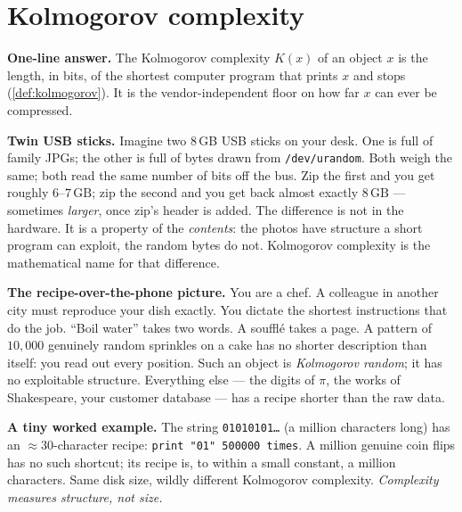 
%

\section{Kolmogorov complexity}
\label{sec:kolmogorov}

\begin{intuition}
\textbf{One-line answer.}  The Kolmogorov complexity $K(x)$ of an
object $x$ is the length, in bits, of the shortest computer program
that prints $x$ and stops (\cref{def:kolmogorov}).  It is the
vendor-independent floor on how far $x$ can ever be compressed.

\textbf{Twin USB sticks.}  Imagine two 8\,GB USB sticks on your desk.
One is full of family JPGs; the other is full of bytes drawn from
\texttt{/dev/urandom}.  Both weigh the same; both read the same number
of bits off the bus.  Zip the first and you get roughly
$6$--$7\,\text{GB}$; zip the second and you get back almost exactly
$8\,\text{GB}$ --- sometimes \emph{larger}, once zip's header is added.
The difference is not in the hardware.  It is a property of the
\emph{contents}: the photos have structure a short program can
exploit, the random bytes do not.  Kolmogorov complexity is the
mathematical name for that difference.

\textbf{The recipe-over-the-phone picture.}  You are a chef.  A
colleague in another city must reproduce your dish exactly.  You
dictate the shortest instructions that do the job.  ``Boil water''
takes two words.  A souffl\'e takes a page.  A pattern of $10{,}000$
genuinely random sprinkles on a cake has no shorter description than
itself: you read out every position.  Such an object is
\emph{Kolmogorov random}; it has no exploitable structure.  Everything
else --- the digits of $\pi$, the works of Shakespeare, your customer
database --- has a recipe shorter than the raw data.

\textbf{A tiny worked example.}  The string \texttt{01010101\ldots} (a
million characters long) has an $\approx 30$-character recipe:
\texttt{print "01" 500000 times}.  A million genuine coin flips has no
such shortcut; its recipe is, to within a small constant, a million
characters.  Same disk size, wildly different Kolmogorov complexity.
\emph{Complexity measures structure, not size.}


\end{intuition}
